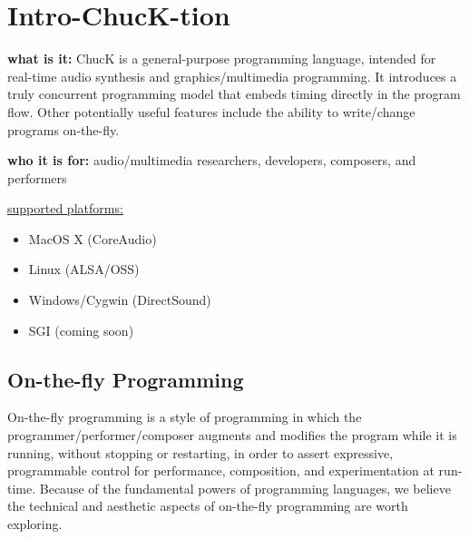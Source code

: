\chapter{Intro-ChucK-tion} 

{\bf what is it:} ChucK is a general-purpose programming language, intended for 
real-time audio synthesis and graphics/multimedia programming.  It 
introduces a truly concurrent programming model that embeds timing 
directly in the program flow.  Other potentially useful features include 
the ability to write/change programs on-the-fly.

{\bf who it is for:} audio/multimedia researchers, developers, composers, and performers

\underline{supported platforms:}
\begin{itemize}
 \item MacOS X (CoreAudio)
 \item Linux (ALSA/OSS)
 \item Windows/Cygwin (DirectSound)
 \item SGI (coming soon)
\end{itemize}

\section{On-the-fly Programming}
On-the-fly programming is a style of programming in which the programmer/performer/composer 
augments and modifies the program while it is running, without stopping or restarting, 
in order to assert expressive, programmable control for performance, composition, and 
experimentation at run-time. Because of the fundamental powers of programming languages, 
we believe the technical and aesthetic aspects of on-the-fly programming are worth exploring.